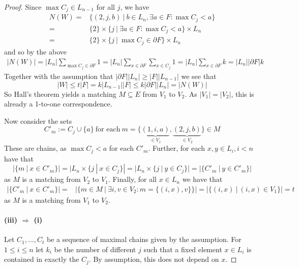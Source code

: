 \documentclass{scrartcl}
\theoremstyle{definition}
\begin{document}
\begin{proof}
    Since $\max C_j \in L_{n - 1}$ for all $j$, we have
    \begin{align*}
        N(W) =& \{ (2, j, b) \ | \ b \in L_n, \exists a \in F: \max C_j < a \} \\
        =& \{2\} \times \{ j \ | \ \exists a \in F: \max C_j < a \} \times L_n \\
        =& \{2\} \times \{ j \ | \ \max C_j \in \partial F \} \times L_n
    \end{align*}
    and so by the above
    \begin{align*}
        |N(W)| = |L_n| \sum_{\max C_j \in \partial F} 1 = |L_n| \sum_{x \in \partial F} \sum_{x \in C_j} 1 = |L_n| \sum_{x \in \partial F} k = |L_n| |\partial F| k
    \end{align*}
    Together with the assumption that $|\partial F| |L_n| \geq |F| |L_{n - 1}|$ we see that
    \begin{equation*}
        |W| \leq t |F| = k |L_{n - 1}| |F| \leq k |\partial F| |L_n| = |N(W)|
    \end{equation*}
    So Hall's theorem yields a matching $M \subseteq E$ from $V_1$ to $V_2$.
    As $|V_1| = |V_2|$, this is already a 1-to-one correspondence.

    Now consider the sets
    \begin{equation*}
        C'_m := C_j \cup \{ a \} \ \text{for each} \ m = \{\underbrace{(1, i, a)}_{\in V_1}, \underbrace{(2, j, b)}_{\in V_2}\} \in M
    \end{equation*}
    These are chains, as $\max C_j < a$ for each $C'_m$.
    Further, for each $x, y \in L_i, i < n$ have that
    \begin{equation*}
        |\{ m \ | \ x \in C'_m \}| = |L_n \times \{ j \ | \ x \in C_j \}| = |L_n \times \{ j \ | \ y \in C_j \}| = |\{ C'_m \ | \ y \in C'_m \}|
    \end{equation*}
    as $M$ is a matching from $V_2$ to $V_1$.
    Finally, for all $x \in L_n$ we have that
    \begin{align*}
        |\{ C'_m \ | \ x \in C'_m \}| =& |\{ m \in M \ | \ \exists i, v \in V_2: m = \{ (i, x), v \} \}| = |\{ (i, x) \ | \ (i, x) \in V_1 \}| = t
    \end{align*}
    as $M$ is a matching from $V_1$ to $V_2$.

    \paragraph{(iii) $\Rightarrow$ (i)} Let $C_1, ..., C_t$ be a sequence of maximal chains given by the assumption.
    For $1 \leq i \leq n$ let $k_i$ be the number of different $j$ such that a fixed element $x \in L_i$ is contained in exactly the $C_j$.
    By assumption, this does not depend on $x$.


\end{proof}
\end{document}
